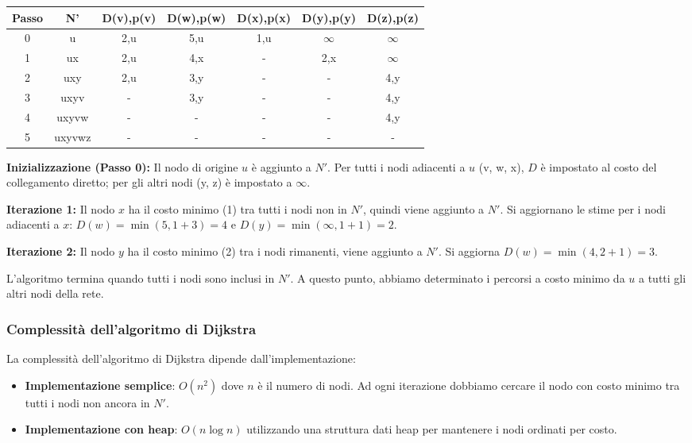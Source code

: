 \begin{table}[H]
\centering
\begin{tabular}{|c|c|c|c|c|c|c|}
\hline
\textbf{Passo} & \textbf{N'} & \textbf{D(v),p(v)} & \textbf{D(w),p(w)} & \textbf{D(x),p(x)} & \textbf{D(y),p(y)} & \textbf{D(z),p(z)} \\
\hline
0 & u & 2,u & 5,u & 1,u & $\infty$ & $\infty$ \\
\hline
1 & ux & 2,u & 4,x & - & 2,x & $\infty$ \\
\hline
2 & uxy & 2,u & 3,y & - & - & 4,y \\
\hline
3 & uxyv & - & 3,y & - & - & 4,y \\
\hline
4 & uxyvw & - & - & - & - & 4,y \\
\hline
5 & uxyvwz & - & - & - & - & - \\
\hline
\end{tabular}
\end{table}

\textbf{Inizializzazione (Passo 0):} Il nodo di origine $u$ è aggiunto a $N'$. Per tutti i nodi adiacenti a $u$ (v, w, x), $D$ è impostato al costo del collegamento diretto; per gli altri nodi (y, z) è impostato a $\infty$.

\textbf{Iterazione 1:} Il nodo $x$ ha il costo minimo (1) tra tutti i nodi non in $N'$, quindi viene aggiunto a $N'$. Si aggiornano le stime per i nodi adiacenti a $x$: $D(w) = \min(5, 1+3) = 4$ e $D(y) = \min(\infty, 1+1) = 2$.

\textbf{Iterazione 2:} Il nodo $y$ ha il costo minimo (2) tra i nodi rimanenti, viene aggiunto a $N'$. Si aggiorna $D(w) = \min(4, 2+1) = 3$.

L'algoritmo termina quando tutti i nodi sono inclusi in $N'$. A questo punto, abbiamo determinato i percorsi a costo minimo da $u$ a tutti gli altri nodi della rete.

\subsubsection*{Complessità dell'algoritmo di Dijkstra}
La complessità dell'algoritmo di Dijkstra dipende dall'implementazione:
\begin{itemize}
  \item \textbf{Implementazione semplice}: $O(n^2)$ dove $n$ è il numero di nodi. Ad ogni iterazione dobbiamo cercare il nodo con costo minimo tra tutti i nodi non ancora in $N'$.
  \item \textbf{Implementazione con heap}: $O(n \log n)$ utilizzando una struttura dati heap per mantenere i nodi ordinati per costo.
\end{itemize}

